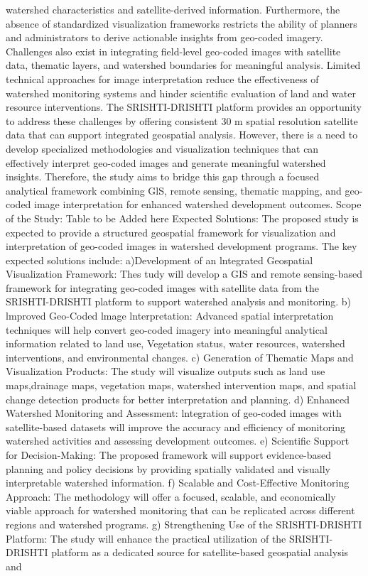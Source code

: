 \documentclass[10pt,a4paper]{article}
\begin{document}
\begin{tcolorbox}[pscard, title={"\textbf{SIH26015} \quad $\vert$ \quad Application of Geospatial Techniques for visualization and analysis to inte...}]
watershed characteristics and satellite-derived information. Furthermore, the absence of standardized visualization frameworks restricts the ability of planners and administrators to derive actionable insights from geo-coded imagery. Challenges also exist in integrating field-level geo-coded images with satellite data, thematic layers, and watershed boundaries for meaningful analysis. Limited technical approaches for image interpretation reduce the effectiveness of watershed monitoring systems and hinder scientific evaluation of land and water resource interventions. The SRISHTI-DRISHTI platform provides an opportunity to address these challenges by offering consistent 30 m spatial resolution satellite data that can support integrated geospatial analysis. However, there is a need to develop specialized methodologies and visualization techniques that can effectively interpret geo-coded images and generate meaningful watershed insights. Therefore, the study aims to bridge this gap through a focused analytical framework combining GlS, remote sensing, thematic mapping, and geo-coded image interpretation for enhanced watershed development outcomes. Scope of the Study: Table to be Added here Expected Solutions: The proposed study is expected to provide a structured geospatial framework for visualization and interpretation of geo-coded images in watershed development programs. The key expected solutions include: a)Development of an lntegrated Geospatial Visualization Framework: Thes tudy will develop a GIS and remote sensing-based framework for integrating geo-coded images with satellite data from the SRISHTI-DRISHTI platform to support watershed analysis and monitoring. b) lmproved Geo-Coded lmage lnterpretation: Advanced spatial interpretation techniques will help convert geo-coded imagery into meaningful analytical information related to land use, Vegetation status, water resources, watershed interventions, and environmental changes. c) Generation of Thematic Maps and Visualization Products: The study will visualize outputs such as land use maps,drainage maps, vegetation maps, watershed intervention maps, and spatial change detection products for better interpretation and planning. d) Enhanced Watershed Monitoring and Assessment: lntegration of geo-coded images with satellite-based datasets will improve the accuracy and efficiency of monitoring watershed activities and assessing development outcomes. e) Scientific Support for Decision-Making: The proposed framework will support evidence-based planning and policy decisions by providing spatially validated and visually interpretable watershed information. f) Scalable and Cost-Effective Monitoring Approach: The methodology will offer a focused, scalable, and economically viable approach for watershed monitoring that can be replicated across different regions and watershed programs. g) Strengthening Use of the SRISHTI-DRISHTI Platform: The study will enhance the practical utilization of the SRISHTI-DRISHTI platform as a dedicated source for satellite-based geospatial analysis and 
\end{tcolorbox}
\end{document}
